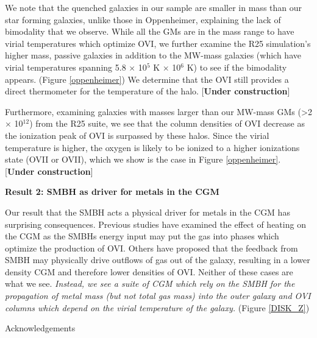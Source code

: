 \documentclass[]{emulateapj}
\begin{document}
We note that the quenched galaxies in our sample are smaller in mass than our star forming galaxies, unlike those in Oppenheimer, explaining the lack of bimodality that we observe. While all the GMs are in the mass range to have virial temperatures which optimize OVI, we further examine the R25 simulation's higher mass, passive galaxies in addition to the MW-mass galaxies (which have virial temperatures spanning 5.8 $\times$ 10$^{5}$ K  $\times$ 10$^{6}$ K) to see if the bimodality appears. (Figure \ref{oppenheimer}) We determine that the OVI still provides a direct thermometer for the temperature of the halo. [\textbf{Under construction}]

Furthermore, examining galaxies with masses larger than our MW-mass GMs (\textgreater 2 $\times$ 10$^{12}$) from the R25 suite, we see that the column densities of OVI decrease as the ionization peak of OVI is surpassed by these halos. Since the virial temperature is higher, the oxygen is likely to be ionized to a higher ionizations state (OVII or OVII), which we show is the case in Figure \ref{oppenheimer}. [\textbf{Under construction}]

\textbf{Result 2: SMBH as driver for metals in the CGM}

Our result that the SMBH acts a physical driver for metals in the CGM has surprising consequences. Previous studies have examined the effect of heating on the CGM as the SMBHs energy input may put the gas into phases which optimize the production of OVI. \citep{Suresh2017} Others have proposed that the feedback from SMBH may physically drive outflows of gas out of the galaxy, resulting in a lower density CGM and therefore lower densities of OVI. Neither of these cases are what we see. \textit{Instead, we see a suite of CGM which rely on the SMBH for the propagation of metal mass (but not total gas mass) into the outer galaxy and OVI columns which depend on the virial temperature of the galaxy.} (Figure \ref{DISK_Z})


\acknowledgments
Acknowledgements


\end{document}

